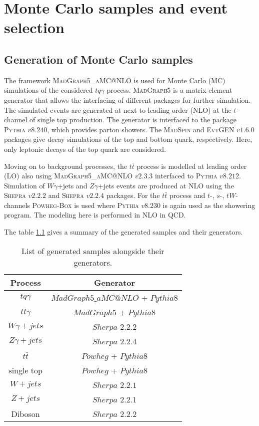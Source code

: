 \chapter{Monte Carlo samples and event selection}


\section{Generation of Monte Carlo samples}
\label{sec:mc}
The framework \textsc{MadGraph5\_aMC@NLO} is used for Monte Carlo (MC) simulations of the considered $tq\gamma$ process. \textsc{MadGraph5} is a matrix element generator that allows the interfacing of different packages for further simulation. 
The simulated events are generated at next-to-leading order (NLO) at the $t$-channel of single top production. The generator is interfaced to the package \textsc{Pythia} $v8.240$, which provides parton showers. 
The \textsc{MadSpin} and \textsc{EvtGEN} $v1.6.0$ packages give decay simulations of the top and bottom quark, respectively. Here, only leptonic decays of the top quark are considered.

Moving on to background processes, the $t\bar{t}$ process is modelled at leading order (LO) also using \textsc{MadGraph5\_aMC@NLO} $v2.3.3$ interfaced to \textsc{Pythia} $v8.212$. 
Simulation of $W\gamma$+jets and $Z\gamma$+jets events are produced at NLO using the \textsc{Shepra} $v2.2.2$ and \textsc{Shepra} $v2.2.4$ packages. For the $t\bar{t}$ process and $t$-, $s$-, $tW$-channels 
\textsc{Powheg-Box} is used where \textsc{Pythia} $v8.230$ is again used as the showering program. The modeling here is performed in NLO in QCD. 

The table \ref{tab:eventgen} gives a summary of the generated samples and their generators.

\begin{table}
    \centering
    \begin{tabular}{c|c}
        \toprule
        Process & Generator\\
        \midrule
        $tq\gamma$&$MadGraph5\_aMC@NLO$ + $Pythia8$\\[.1cm]
        $t\bar{t}\gamma$&$MadGraph5$ + $Pythia8$\\[.1cm]
        $W\gamma + jets$&$Sherpa$ $2.2.2$\\[.1cm]
        $Z\gamma + jets$ &$Sherpa$ $2.2.4$\\[.1cm]
        $t\bar{t}$ &$Powheg$ + $Pythia8$\\[.1cm]
        single top&$Powheg$ + $Pythia8$\\[.1cm]
        $W+jets$& $Sherpa$ $2.2.1$\\[.1cm]
        $Z+jets$ &$Sherpa$ $2.2.1$\\[.1cm]
        Diboson &$Sherpa$ $2.2.2$\\
        \bottomrule
    \end{tabular}
    \caption{List of generated samples alongside their generators.}
    \label{tab:eventgen}
\end{table}
